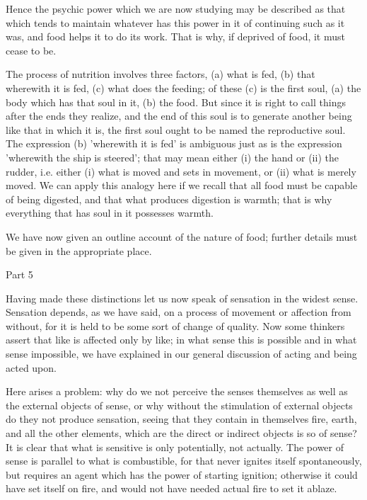 Hence the psychic power which we are now studying may be described
as that which tends to maintain whatever has this power in it of continuing
such as it was, and food helps it to do its work. That is why, if
deprived of food, it must cease to be. 

The process of nutrition involves three factors, (a) what is fed,
(b) that wherewith it is fed, (c) what does the feeding; of these
(c) is the first soul, (a) the body which has that soul in it, (b)
the food. But since it is right to call things after the ends they
realize, and the end of this soul is to generate another being like
that in which it is, the first soul ought to be named the reproductive
soul. The expression (b) 'wherewith it is fed' is ambiguous just as
is the expression 'wherewith the ship is steered'; that may mean either
(i) the hand or (ii) the rudder, i.e. either (i) what is moved and
sets in movement, or (ii) what is merely moved. We can apply this
analogy here if we recall that all food must be capable of being digested,
and that what produces digestion is warmth; that is why everything
that has soul in it possesses warmth. 

We have now given an outline account of the nature of food; further
details must be given in the appropriate place. 

Part 5

Having made these distinctions let us now speak of sensation in the
widest sense. Sensation depends, as we have said, on a process of
movement or affection from without, for it is held to be some sort
of change of quality. Now some thinkers assert that like is affected
only by like; in what sense this is possible and in what sense impossible,
we have explained in our general discussion of acting and being acted
upon. 

Here arises a problem: why do we not perceive the senses themselves
as well as the external objects of sense, or why without the stimulation
of external objects do they not produce sensation, seeing that they
contain in themselves fire, earth, and all the other elements, which
are the direct or indirect objects is so of sense? It is clear that
what is sensitive is only potentially, not actually. The power of
sense is parallel to what is combustible, for that never ignites itself
spontaneously, but requires an agent which has the power of starting
ignition; otherwise it could have set itself on fire, and would not
have needed actual fire to set it ablaze. 

